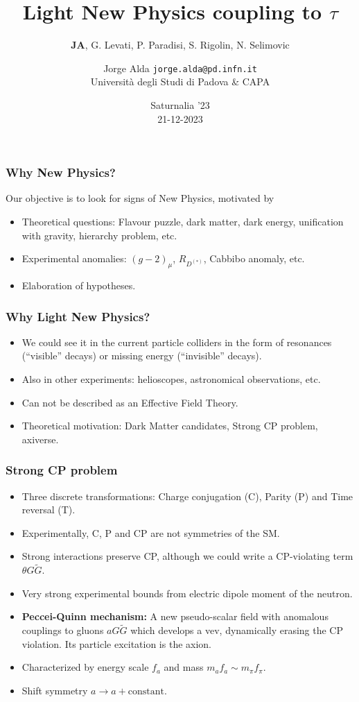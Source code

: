 \documentclass[mathserif, 10pt, aspectratio=169]{beamer}
\title{Light New Physics coupling to $\tau$}
\subtitle{{\bf JA}, G. Levati, P. Paradisi, S. Rigolin, N. Selimovic}
\author[Jorge Alda]{Jorge Alda \hspace{4em} \texttt{jorge.alda@pd.infn.it} \\
Università degli Studi di Padova \& CAPA}
\date[Saturnalia '23]{Saturnalia '23 \\ 21-12-2023}
\begin{document}
\begin{frame}

\titlepage

\end{frame}

\begin{frame}\frametitle{Why New Physics?}
    Our objective is to look for signs of New Physics, motivated by\vspace{20pt}
    \begin{itemize}\setlength{\itemsep}{10pt}
        \item Theoretical questions: Flavour puzzle, dark matter, dark energy, unification with gravity, hierarchy problem, etc.
        \item Experimental anomalies: $(g-2)_\mu$, $R_{D^{(*)}}$, Cabbibo anomaly, etc.
        \item Elaboration of hypotheses.
    \end{itemize}
\end{frame}

\begin{frame}\frametitle{Why Light New Physics?}
    \begin{itemize}\setlength{\itemsep}{10pt}
        \item We could see it in the current particle colliders in the form of resonances (``visible'' decays) or missing energy (``invisible'' decays).
        \item Also in other experiments: helioscopes, astronomical observations, etc.
        \item Can not be described as an Effective Field Theory.
        \item Theoretical motivation: Dark Matter candidates, Strong CP problem, axiverse.
    \end{itemize}
\end{frame}

\begin{frame}\frametitle{Strong CP problem}
    \begin{itemize}\setlength{\itemsep}{10pt}
        \item Three discrete transformations: Charge conjugation (C), Parity (P) and Time reversal (T).
        \item Experimentally, C, P and CP are not symmetries of the SM.
        \item Strong interactions preserve CP, although we could write a CP-violating term $\theta G\tilde{G}$.
        \item Very strong experimental bounds from electric dipole moment of the neutron.
        \item {\bf Peccei-Quinn mechanism:} A new pseudo-scalar field with anomalous couplings to gluons $a G\tilde{G}$ which develops a vev, dynamically erasing the CP violation. Its particle excitation is the axion.
        \item Characterized by energy scale $f_a$ and mass $m_a f_a \sim m_\pi f_\pi$.
        \item Shift symmetry $a \to a + \mathrm{constant}$.
    \end{itemize}
\end{frame}
\end{document}

